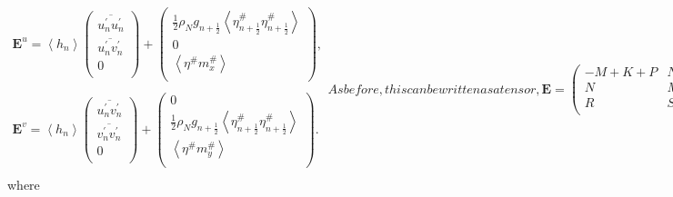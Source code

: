 \documentclass[12pt,a4paper]{report}
\newcommand*\thkmean[1]{\overline{#1}}
\newcommand*\thkres[1]{{#1}^{\prime}}
\newcommand*\nthkmean[1]{\left\langle{#1}\right\rangle}
\newcommand*\nthkres[1]{{#1}^{\#}}
\newcommand*{\half}{\frac{1}{2}}
\begin{document}
\begin{subequations}
\begin{equation}
\begin{array}{c}
    	\boldsymbol{E}^{u}=\nthkmean{h_{n}}\left(
    	\begin{array}{c}
    	\thkmean{\thkres{u}_{n}\thkres{u}_{n}} \\
    	\thkmean{\thkres{u}_{n}\thkres{v}_{n}} \\
    	0 \\
    	\end{array}\right)+\left(
    	\begin{array}{c}
    	\half\rho_{N}g_{n+\half} \nthkmean{\nthkres{\eta}_{n+\half}\nthkres{\eta}_{n+\half}} \\
    	0 \\
    	\nthkmean{\nthkres{\eta}\nthkres{m}_{x}} \\
    	\end{array}\right), \\ \\
    	\boldsymbol{E}^{v}=\nthkmean{h_{n}}\left(
    	\begin{array}{c}
    	\thkmean{\thkres{u}_{n}\thkres{v}_{n}} \\
    	\thkmean{\thkres{v}_{n}\thkres{v}_{n}} \\
    	0 \\
    	\end{array}\right)+\left(
    	\begin{array}{c}
    	0\\
    	\half\rho_{N}g_{n+\half} \nthkmean{\nthkres{\eta}_{n+\half}\nthkres{\eta}_{n+\half}} \\
    	\nthkmean{\nthkres{\eta}\nthkres{m}_{y}} \\
    	\end{array}\right). \\
    	\end{array}
    	\end{equation}
    As before, this can be written as a tensor,
    \begin{equation}
    \boldsymbol{E}=\left(\begin{array}{ccc}
    -M + K + P & N & 0 \\
    N & M + K + P& 0 \\
    R & S & 0 \\
    \end{array}\right),
    \end{equation}
    \end{subequations}
    where 
\end{document}

